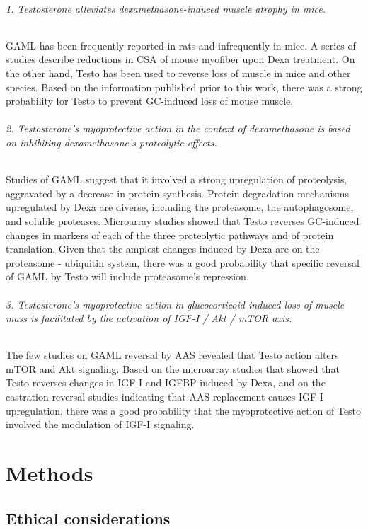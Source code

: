 \documentclass[12pt,english]{report}\usepackage[]{graphicx}\usepackage[]{color}
\begin{document}
\subparagraph*{1. Testosterone alleviates dexamethasone-induced muscle atrophy in
mice.}

GAML has been frequently reported in rats and infrequently in mice.
A series of studies describe reductions in CSA of mouse myofiber upon
Dexa treatment. On the other hand, Testo has been used to reverse
loss of muscle in mice and other species. Based on the information
published prior to this work, there was a strong probability for Testo
to prevent GC-induced loss of mouse muscle.


\subparagraph*{2. Testosterone's myoprotective action in the context of dexamethasone
is based on inhibiting dexamethasone's proteolytic effects.}

Studies of GAML suggest that it involved a strong upregulation of
proteolysis, aggravated by a decrease in protein synthesis. Protein
degradation mechanisms upregulated by Dexa are diverse, including
the proteasome, the autophagosome, and soluble proteases. Microarray
studies showed that Testo reverses GC-induced changes in markers of
each of the three proteolytic pathways and of protein translation.
Given that the amplest changes induced by Dexa are on the proteasome
- ubiquitin system, there was a good probability that specific reversal
of GAML by Testo will include proteasome's repression.


\subparagraph*{3. Testosterone's myoprotective action in glucocorticoid-induced
loss of muscle mass is facilitated by the activation of IGF-I / Akt
/ mTOR axis.}

The few studies on GAML reversal by AAS revealed that Testo action
alters mTOR and Akt signaling. Based on the microarray studies that
showed that Testo reverses changes in IGF-I and IGFBP induced by Dexa,
and on the castration reversal studies indicating that AAS replacement
causes IGF-I upregulation, there was a good probability that the myoprotective
action of Testo involved the modulation of IGF-I signaling.

\begin{singlespace}
\pagebreak{}
\end{singlespace}


\chapter{Methods}


\section{Ethical considerations}
\end{document}
